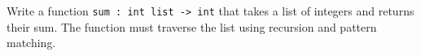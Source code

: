 Write a function \lstinline{sum : int list -> int} that takes a list of integers and returns their sum. The function must traverse the list using recursion and pattern matching. 
